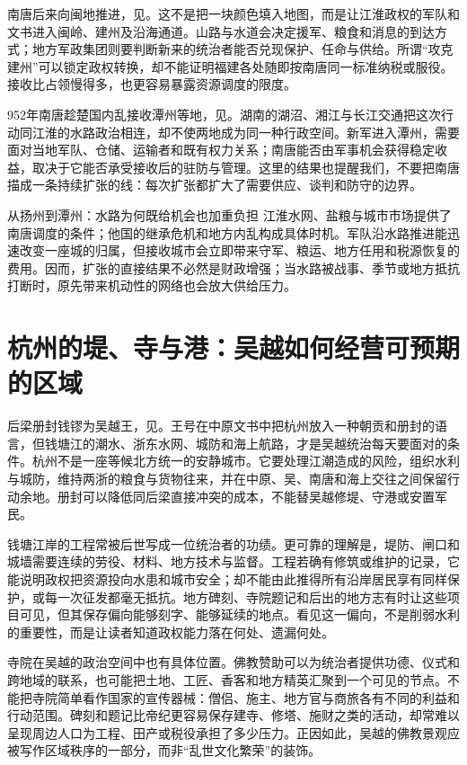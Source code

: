 南唐后来向闽地推进，见。这不是把一块颜色填入地图，而是让江淮政权的军队和文书进入闽岭、建州及沿海通道。山路与水道会决定援军、粮食和消息的到达方式；地方军政集团则要判断新来的统治者能否兑现保护、任命与供给。所谓“攻克建州”可以锁定政权转换，却不能证明福建各处随即按南唐同一标准纳税或服役。接收比占领慢得多，也更容易暴露资源调度的限度。

952年南唐趁楚国内乱接收潭州等地，见。湖南的湖沼、湘江与长江交通把这次行动同江淮的水路政治相连，却不使两地成为同一种行政空间。新军进入潭州，需要面对当地军队、仓储、运输者和既有权力关系；南唐能否由军事机会获得稳定收益，取决于它能否承受接收后的驻防与管理。这里的结果也提醒我们，不要把南唐描成一条持续扩张的线：每次扩张都扩大了需要供应、谈判和防守的边界。

\begin{causalchain}{从扬州到潭州：水路为何既给机会也加重负担}
江淮水网、盐粮与城市市场提供了南唐调度的条件；他国的继承危机和地方内乱构成具体时机。军队沿水路推进能迅速改变一座城的归属，但接收城市会立即带来守军、粮运、地方任用和税源恢复的费用。因而，扩张的直接结果不必然是财政增强；当水路被战事、季节或地方抵抗打断时，原先带来机动性的网络也会放大供给压力。
\end{causalchain}

\section{杭州的堤、寺与港：吴越如何经营可预期的区域}

后梁册封钱镠为吴越王，见。王号在中原文书中把杭州放入一种朝贡和册封的语言，但钱塘江的潮水、浙东水网、城防和海上航路，才是吴越统治每天要面对的条件。杭州不是一座等候北方统一的安静城市。它要处理江潮造成的风险，组织水利与城防，维持两浙的粮食与货物往来，并在中原、吴、南唐和海上交往之间保留行动余地。册封可以降低同后梁直接冲突的成本，不能替吴越修堤、守港或安置军民。

钱塘江岸的工程常被后世写成一位统治者的功绩。更可靠的理解是，堤防、闸口和城墙需要连续的劳役、材料、地方技术与监督。工程若确有修筑或维护的记录，它能说明政权把资源投向水患和城市安全；却不能由此推得所有沿岸居民享有同样保护，或每一次征发都毫无抵抗。地方碑刻、寺院题记和后出的地方志有时让这些项目可见，但其保存偏向能够刻字、能够延续的地点。看见这一偏向，不是削弱水利的重要性，而是让读者知道政权能力落在何处、遗漏何处。

寺院在吴越的政治空间中也有具体位置。佛教赞助可以为统治者提供功德、仪式和跨地域的联系，也可能把土地、工匠、香客和地方精英汇聚到一个可见的节点。不能把寺院简单看作国家的宣传器械：僧侣、施主、地方官与商旅各有不同的利益和行动范围。碑刻和题记比帝纪更容易保存建寺、修塔、施财之类的活动，却常难以呈现周边人口为工程、田产或税役承担了多少压力。正因如此，吴越的佛教景观应被写作区域秩序的一部分，而非“乱世文化繁荣”的装饰。

